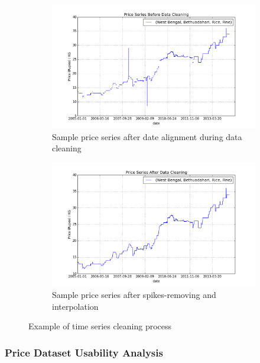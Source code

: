\begin{figure}[!ht]
    \centering
        \begin{subfigure}[b]{.45\textwidth}
        \centering
        \includegraphics[width=\textwidth]{./img/before.png}
        \caption{Sample price series after date alignment during data cleaning}
        \label{subfig:sc1}
        \end{subfigure}
        \quad
        \begin{subfigure}[b]{.45\textwidth}
        \centering
        \includegraphics[width=\textwidth]{./img/after.png}
        \caption{Sample price series after spikes-removing and interpolation}
        \label{subfig:sc2}
        \end{subfigure}

    \caption{Example of time series cleaning process}
    \label{fig:series_cleaning}
\end{figure}

\subsubsection*{Price Dataset Usability Analysis}


